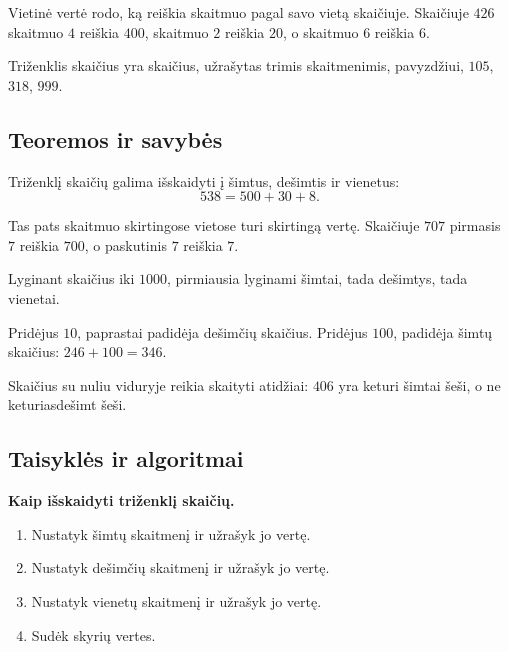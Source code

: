 \begin{apibreztis}
Vietinė vertė rodo, ką reiškia skaitmuo pagal savo vietą skaičiuje. Skaičiuje \(426\) skaitmuo \(4\) reiškia \(400\), skaitmuo \(2\) reiškia \(20\), o skaitmuo \(6\) reiškia \(6\).
\end{apibreztis}

\begin{apibreztis}
Triženklis skaičius yra skaičius, užrašytas trimis skaitmenimis, pavyzdžiui, \(105\), \(318\), \(999\).
\end{apibreztis}

\subsection{Teoremos ir savybės}

\begin{savybe}
Triženklį skaičių galima išskaidyti į šimtus, dešimtis ir vienetus:
\[
538=500+30+8.
\]
\end{savybe}

\begin{savybe}
Tas pats skaitmuo skirtingose vietose turi skirtingą vertę. Skaičiuje \(707\) pirmasis \(7\) reiškia \(700\), o paskutinis \(7\) reiškia \(7\).
\end{savybe}

\begin{savybe}
Lyginant skaičius iki \(1000\), pirmiausia lyginami šimtai, tada dešimtys, tada vienetai.
\end{savybe}

\begin{savybe}
Pridėjus \(10\), paprastai padidėja dešimčių skaičius. Pridėjus \(100\), padidėja šimtų skaičius: \(246+100=346\).
\end{savybe}

\begin{pastaba}
Skaičius su nuliu viduryje reikia skaityti atidžiai: \(406\) yra keturi šimtai šeši, o ne keturiasdešimt šeši.
\end{pastaba}

\subsection{Taisyklės ir algoritmai}

\textbf{Kaip išskaidyti triženklį skaičių.}
\begin{enumerate}
\item Nustatyk šimtų skaitmenį ir užrašyk jo vertę.
\item Nustatyk dešimčių skaitmenį ir užrašyk jo vertę.
\item Nustatyk vienetų skaitmenį ir užrašyk jo vertę.
\item Sudėk skyrių vertes.
\end{enumerate}

